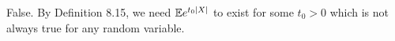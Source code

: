 
False. By Definition 8.15, we need $ \mathbb{E} e^{t_0 |X|} $ to exist for some $ t_0 > 0$ which is not
always true for any random variable.
